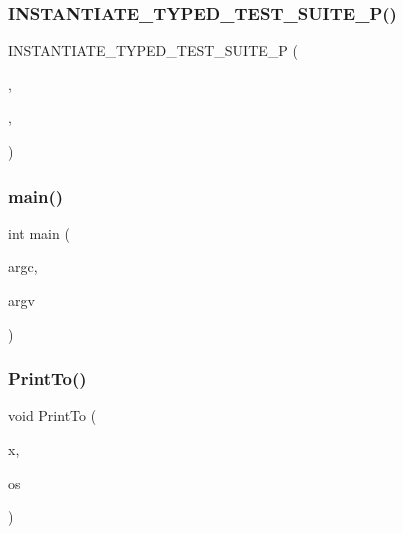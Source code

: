 \subsubsection{\texorpdfstring{INSTANTIATE\_TYPED\_TEST\_SUITE\_P()}{INSTANTIATE\_TYPED\_TEST\_SUITE\_P()}}
{\footnotesize\ttfamily I\+N\+S\+T\+A\+N\+T\+I\+A\+T\+E\+\_\+\+T\+Y\+P\+E\+D\+\_\+\+T\+E\+S\+T\+\_\+\+S\+U\+I\+T\+E\+\_\+P (\begin{DoxyParamCaption}\item[{My}]{,  }\item[{\mbox{\hyperlink{class_type_param_test}{Type\+Param\+Test}}}]{,  }\item[{\mbox{\hyperlink{googletest-master_2googletest_2test_2googletest-list-tests-unittest___8cc_a16f58cd49c18568802322bbaf9f3f654}{My\+Types}}}]{ }\end{DoxyParamCaption})}

\mbox{\label{googletest-master_2googletest_2test_2googletest-list-tests-unittest___8cc_a3c04138a5bfe5d72780bb7e82a18e627}} 
\subsubsection{\texorpdfstring{main()}{main()}}
{\footnotesize\ttfamily int main (\begin{DoxyParamCaption}\item[{int}]{argc,  }\item[{char $\ast$$\ast$}]{argv }\end{DoxyParamCaption})}

\mbox{\label{googletest-master_2googletest_2test_2googletest-list-tests-unittest___8cc_aaf76f8f336db1c295fe3aa914c4c6182}} 
\subsubsection{\texorpdfstring{PrintTo()}{PrintTo()}}
{\footnotesize\ttfamily void Print\+To (\begin{DoxyParamCaption}\item[{const \mbox{\hyperlink{class_my_type}{My\+Type}} \&}]{x,  }\item[{std\+::ostream $\ast$}]{os }\end{DoxyParamCaption})}

